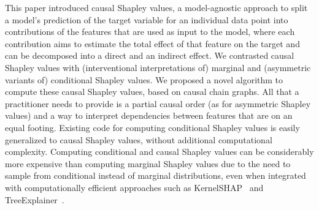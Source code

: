 \documentclass{article}
\newcommand{\comment}[1]{{\color{red} #1}}
\begin{document}
This paper introduced causal Shapley values, a model-agnostic approach to split a model's prediction of the target variable for an individual data point into contributions of the features that are used as input to the model, where each contribution aims to estimate the total effect of that feature on the target and can be decomposed into a direct and an indirect effect. We contrasted causal Shapley values with (interventional interpretations of) marginal and (asymmetric variants of) conditional Shapley values.
We proposed a novel algorithm to compute these causal Shapley values, based on causal chain graphs. All that a practitioner needs to provide is a partial causal order (as for asymmetric Shapley values) and a way to interpret dependencies between features that are on an equal footing.
Existing code for computing conditional Shapley values is easily generalized to causal Shapley values, without additional computational complexity. Computing conditional and causal Shapley values can be considerably more expensive than computing marginal Shapley values due to the need to sample from conditional instead of marginal distributions, even when integrated with computationally efficient approaches such as KernelSHAP~\cite{lundberg2017unified} and TreeExplainer~\cite{lundberg2020local}.

\end{document}
